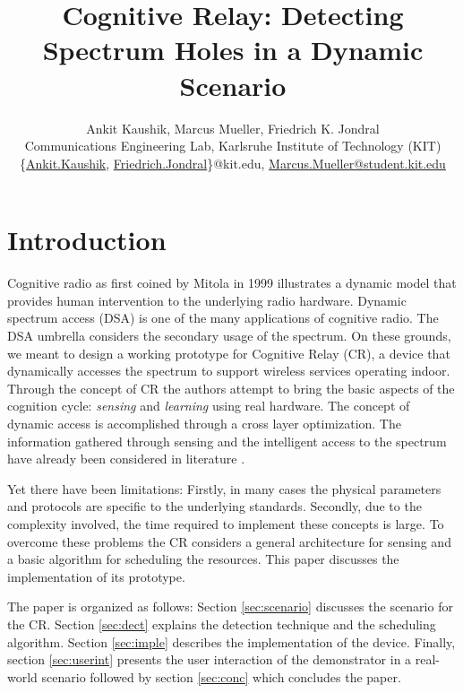 \documentclass[conference,a4paper]{IEEEtran}
\title{Cognitive Relay: Detecting Spectrum Holes in a Dynamic Scenario}
\author{Ankit Kaushik, Marcus Mueller, Friedrich K. Jondral \\
        Communications Engineering Lab, Karlsruhe Institute of Technology (KIT) \\
        \{\href{mailto:Ankit.Kaushik@kit.edu}{Ankit.Kaushik}, 
        \href{mailto:Friedrich.Jondral@kit.edu}{Friedrich.Jondral}\}@kit.edu,
        \href{mailto:Marcus.Mueller@student.kit.edu}{Marcus.Mueller@student.kit.edu} }
\begin{document}
%
\maketitle
\thispagestyle{empty}
\pagestyle{empty}
\section{Introduction}
Cognitive radio as first coined by Mitola \cite{mitola} in 1999 illustrates a
dynamic model that provides human intervention to the underlying radio
hardware.
Dynamic spectrum access (DSA) is one of the many applications of
cognitive radio. The DSA umbrella \cite{QS07} considers the secondary usage of
the spectrum. On these grounds, we meant to design a working prototype for
Cognitive Relay (CR), a device that dynamically accesses the spectrum to
support wireless services operating indoor.\\
Through the concept of CR the authors
attempt to bring the basic aspects of the cognition cycle: \textit{sensing} and
\textit{learning} using real hardware. The concept of dynamic access is
accomplished through a cross layer optimization. The information gathered
through sensing and the intelligent access to the spectrum have already been
considered in literature \cite{hossain09}.

Yet there have been limitations: Firstly, in many cases the physical parameters and protocols are
specific to the underlying standards.
Secondly, due to the complexity involved,
the time required to implement these concepts is large. To overcome these
problems the CR considers a general architecture for sensing and a basic
algorithm for scheduling the resources. This paper discusses the implementation
of its prototype.

The paper is organized as follows: Section \ref{sec:scenario}
discusses the scenario for the CR. Section \ref{sec:dect} explains the
detection technique and the scheduling algorithm. Section \ref{sec:imple}
describes the implementation of the device. Finally, section \ref{sec:userint}
presents the user interaction of the demonstrator in a real-world scenario followed
by section \ref{sec:conc} which concludes the paper.
\end{document}
